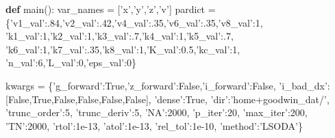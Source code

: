 \documentclass[
  english,
  a4paper,
  oneside]{article}
\newenvironment{Shaded}{}{}
\newcommand{\DecValTok}[1]{\textcolor[rgb]{0.25,0.63,0.44}{#1}}
\newcommand{\FloatTok}[1]{\textcolor[rgb]{0.25,0.63,0.44}{#1}}
\newcommand{\KeywordTok}[1]{\textcolor[rgb]{0.00,0.44,0.13}{\textbf{#1}}}
\newcommand{\NormalTok}[1]{#1}
\newcommand{\OperatorTok}[1]{\textcolor[rgb]{0.40,0.40,0.40}{#1}}
\newcommand{\StringTok}[1]{\textcolor[rgb]{0.25,0.44,0.63}{#1}}
\newcommand{\VariableTok}[1]{\textcolor[rgb]{0.10,0.09,0.49}{#1}}
\begin{document}
\begin{Shaded}
\begin{Highlighting}[]
\KeywordTok{def}\NormalTok{ main():}
\NormalTok{    var_names }\OperatorTok{=}\NormalTok{ [}\StringTok{'x'}\NormalTok{,}\StringTok{'y'}\NormalTok{,}\StringTok{'z'}\NormalTok{,}\StringTok{'v'}\NormalTok{]}
\NormalTok{    pardict }\OperatorTok{=}\NormalTok{ \{}\StringTok{'v1_val'}\NormalTok{:.}\DecValTok{84}\NormalTok{,}\StringTok{'v2_val'}\NormalTok{:.}\DecValTok{42}\NormalTok{,}\StringTok{'v4_val'}\NormalTok{:.}\DecValTok{35}\NormalTok{,}\StringTok{'v6_val'}\NormalTok{:.}\DecValTok{35}\NormalTok{,}\StringTok{'v8_val'}\NormalTok{:}\DecValTok{1}\NormalTok{,}
               \StringTok{'k1_val'}\NormalTok{:}\DecValTok{1}\NormalTok{,}\StringTok{'k2_val'}\NormalTok{:}\DecValTok{1}\NormalTok{,}\StringTok{'k3_val'}\NormalTok{:.}\DecValTok{7}\NormalTok{,}\StringTok{'k4_val'}\NormalTok{:}\DecValTok{1}\NormalTok{,}\StringTok{'k5_val'}\NormalTok{:.}\DecValTok{7}\NormalTok{,}
               \StringTok{'k6_val'}\NormalTok{:}\DecValTok{1}\NormalTok{,}\StringTok{'k7_val'}\NormalTok{:.}\DecValTok{35}\NormalTok{,}\StringTok{'k8_val'}\NormalTok{:}\DecValTok{1}\NormalTok{,}\StringTok{'K_val'}\NormalTok{:}\FloatTok{0.5}\NormalTok{,}\StringTok{'kc_val'}\NormalTok{:}\DecValTok{1}\NormalTok{,}
               \StringTok{'n_val'}\NormalTok{:}\DecValTok{6}\NormalTok{,}\StringTok{'L_val'}\NormalTok{:}\DecValTok{0}\NormalTok{,}\StringTok{'eps_val'}\NormalTok{:}\DecValTok{0}\NormalTok{\}}
    
\NormalTok{    kwargs }\OperatorTok{=}\NormalTok{ \{}\StringTok{'g_forward'}\NormalTok{:}\VariableTok{True}\NormalTok{,}\StringTok{'z_forward'}\NormalTok{:}\VariableTok{False}\NormalTok{,}\StringTok{'i_forward'}\NormalTok{:}\VariableTok{False}\NormalTok{,}
              \StringTok{'i_bad_dx'}\NormalTok{:[}\VariableTok{False}\NormalTok{,}\VariableTok{True}\NormalTok{,}\VariableTok{False}\NormalTok{,}\VariableTok{False}\NormalTok{,}\VariableTok{False}\NormalTok{,}\VariableTok{False}\NormalTok{],}
              \StringTok{'dense'}\NormalTok{:}\VariableTok{True}\NormalTok{,}
              \StringTok{'dir'}\NormalTok{:}\StringTok{'home+goodwin_dat/'}\NormalTok{,}
              \StringTok{'trunc_order'}\NormalTok{:}\DecValTok{5}\NormalTok{,}
              \StringTok{'trunc_deriv'}\NormalTok{:}\DecValTok{5}\NormalTok{,}
              \StringTok{'NA'}\NormalTok{:}\DecValTok{2000}\NormalTok{,}
              \StringTok{'p_iter'}\NormalTok{:}\DecValTok{20}\NormalTok{,}
              \StringTok{'max_iter'}\NormalTok{:}\DecValTok{200}\NormalTok{,}
              \StringTok{'TN'}\NormalTok{:}\DecValTok{2000}\NormalTok{,}
              \StringTok{'rtol'}\NormalTok{:}\FloatTok{1e-13}\NormalTok{,}
              \StringTok{'atol'}\NormalTok{:}\FloatTok{1e-13}\NormalTok{,}
              \StringTok{'rel_tol'}\NormalTok{:}\FloatTok{1e-10}\NormalTok{,}
              \StringTok{'method'}\NormalTok{:}\StringTok{'LSODA'}\NormalTok{\}}
              

\end{Highlighting}
\end{Shaded}
\end{document}
